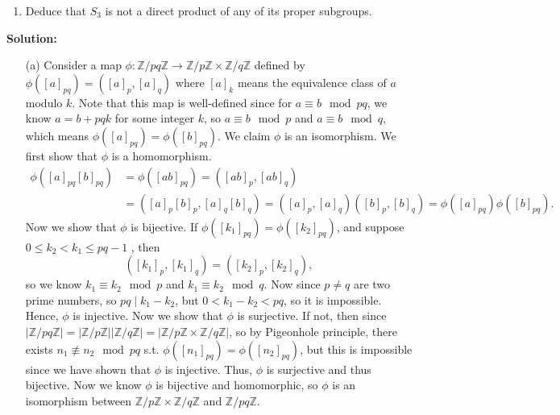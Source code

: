 \documentclass[12pt]{article}
\begin{document}
\begin{enumerate}
\begin{enumerate}[label=(\alph*)]
        \item Deduce that \( S_3 \) is not a direct product of any of its proper subgroups.
    \end{enumerate}
    \textbf{Solution:} 
    \begin{itemize}
        \item [(a)] Consider a map \(\phi : \mathbb{Z} / pq \mathbb{Z} \to \mathbb{Z} / p\mathbb{Z}  \times \mathbb{Z} / q\mathbb{Z} \) defined by \(\phi \left( [a]_{pq} \right) = \left( [a]_p, [a]_q \right)\) where \([a]_k\) means the equivalence class of \(a\) modulo \(k\). Note that this map is well-defined since for \(a \equiv b \mod{pq}\), we know \(a = b + pq k\) for some integer \(k\), so \(a \equiv b \mod{p}\) and \(a \equiv b \mod{q}\), which means \(\phi \left( [a]_{pq} \right) = \phi \left( [b]_{pq} \right)  \). We claim \(\phi \) is an isomorphism. We first show that \(\phi \) is a homomorphism. 
        \begin{align*}
            \phi \left( [a]_{pq} [b]_{pq} \right) &= \phi \left( [ab]_{pq} \right) = \left( [ab]_p, [ab]_q \right) \\ &= \left( [a]_p [b]_p, [a]_q [b]_q \right) = \left( [a]_p, [a]_q \right) \left( [b]_p, [b]_q \right) = \phi \left( [a]_{pq} \right) \phi \left( [b]_{pq} \right).   
        \end{align*}
        Now we show that \(\phi \) is bijective. If \(\phi \left( [k_1]_{pq} \right) = \phi \left( [k_2]_{pq} \right)  \), and suppose \(0 \le k_2 < k_1 \le pq - 1\) , then 
        \[
            \left( [k_1]_p, [k_1]_q \right) = \left( [k_2]_p, [k_2]_q \right),
        \] so we know \(k_1 \equiv k_2 \mod{p}\) and \(k_1 \equiv k_2 \mod{q}\). Now since \(p \neq q\) are two prime numbers, so \(pq \mid k_1 - k_2\), but \(0 < k_1 - k_2 < pq\), so it is impossible. Hence, \(\phi \) is injective. Now we show that \(\phi \) is surjective. If not, then since \(\left\vert \mathbb{Z} / pq \mathbb{Z}  \right\vert = \left\vert \mathbb{Z} / p \mathbb{Z}  \right\vert \left\vert \mathbb{Z} / q\mathbb{Z}  \right\vert = \left\vert \mathbb{Z} / p \mathbb{Z} \times \mathbb{Z} / q\mathbb{Z}  \right\vert  \), so by Pigeonhole principle, there exists \(n_1 \not\equiv n_2 \mod{pq}\) s.t. \(\phi \left( [n_1]_{pq} \right) = \phi \left( [n_2]_{pq} \right)  \), but this is impossible since we have shown that \(\phi \) is injective. Thus, \(\phi \) is surjective and thus bijective. Now we know \(\phi \) is bijective and homomorphic, so \(\phi \) is an isomorphism between \(\mathbb{Z} / p \mathbb{Z} \times \mathbb{Z} / q\mathbb{Z} \) and \(\mathbb{Z} / pq\mathbb{Z} \).           
        

\end{itemize}
\end{enumerate}
\end{document}
